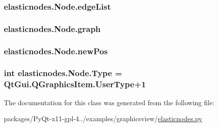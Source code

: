 \subsubsection[{edge\+List}]{\setlength{\rightskip}{0pt plus 5cm}elasticnodes.\+Node.\+edge\+List}\label{classelasticnodes_1_1Node_aa8d0dd31a0ef5d1f3d5253497896fbbb}
\hypertarget{classelasticnodes_1_1Node_a14dd1602ce6303506dcbd8eb653f7c10}{}
\subsubsection[{graph}]{\setlength{\rightskip}{0pt plus 5cm}elasticnodes.\+Node.\+graph}\label{classelasticnodes_1_1Node_a14dd1602ce6303506dcbd8eb653f7c10}
\hypertarget{classelasticnodes_1_1Node_a0ac3e9190e5404d6d392bb0ae59c3850}{}
\subsubsection[{new\+Pos}]{\setlength{\rightskip}{0pt plus 5cm}elasticnodes.\+Node.\+new\+Pos}\label{classelasticnodes_1_1Node_a0ac3e9190e5404d6d392bb0ae59c3850}
\hypertarget{classelasticnodes_1_1Node_a0c5ef77ff3681397d4e1784496278133}{}
\subsubsection[{Type}]{\setlength{\rightskip}{0pt plus 5cm}int elasticnodes.\+Node.\+Type = Qt\+Gui.\+Q\+Graphics\+Item.\+User\+Type+1\hspace{0.3cm}{\ttfamily [static]}}\label{classelasticnodes_1_1Node_a0c5ef77ff3681397d4e1784496278133}


The documentation for this class was generated from the following file\+:\begin{DoxyCompactItemize}
\item 
packages/\+Py\+Qt-\/x11-\/gpl-\/4../examples/graphicsview/\hyperlink{elasticnodes_8py}{elasticnodes.\+py}\end{DoxyCompactItemize}
